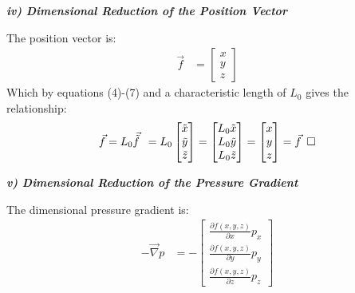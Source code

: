 \documentclass[titlepage]{article}
\begin{document}
\begin{center}
    \textbf{\emph{iv) Dimensional Reduction of the Position Vector}}
\end{center}
The position vector is: 
\begin{align}
    \vec{f} &= \begin{bmatrix}
        x \\
        y \\
        z 
    \end{bmatrix}
\end{align}
\noindent Which by equations (4)-(7) and a characteristic length of $L_{0}$ gives the relationship: 
\begin{align}
    \vec{f}=L_{0}\vec{\tilde{f}}\hspace*{5pt}
    =L_{0}\begin{bmatrix}
        \tilde{x} \\
        \tilde{y} \\
        \tilde{z}
    \end{bmatrix}
    =\begin{bmatrix}
        L_{0}\tilde{x}\\
        L_{0}\tilde{y} \\
        L_{0}\tilde{z}
    \end{bmatrix}
    = \begin{bmatrix}
        x \\
        y \\
        z 
    \end{bmatrix}
    =\vec{f} \hspace*{5pt}\square
\end{align}

\begin{center}
    \textbf{\emph{v) Dimensional Reduction of the Pressure Gradient}}
\end{center}

\noindent The dimensional pressure gradient is:
\begin{align}
    -\vec{\nabla}p &= -\begin{bmatrix}
        \displaystyle\frac{\partial{f\left(x,y,z\right)}}{\partial{x}}p_{x} \\[0.4cm]
        \displaystyle\frac{\partial{f\left(x,y,z\right)}}{\partial{y}}p_{y} \\[0.4cm]
        \displaystyle\frac{\partial{f\left(x,y,z\right)}}{\partial{z}}p_{z}
    \end{bmatrix}
\end{align}
\end{document}
